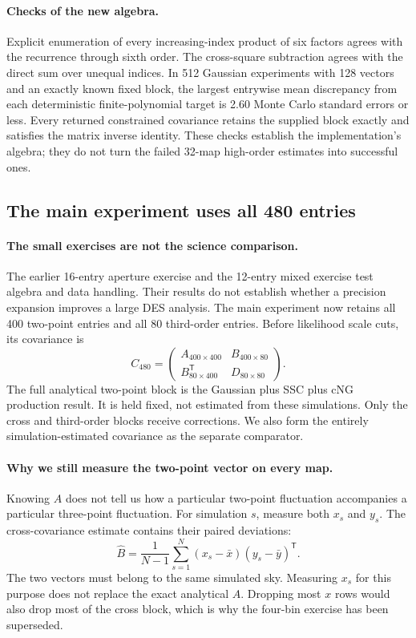 \paragraph{Checks of the new algebra.}
Explicit enumeration of every increasing-index product of six factors
agrees with the recurrence through sixth order. The cross-square subtraction
agrees with the direct sum over unequal indices. In 512 Gaussian experiments
with 128 vectors and an exactly known fixed block, the largest entrywise
mean discrepancy from each deterministic finite-polynomial target is 2.60
Monte Carlo standard errors or less. Every returned constrained covariance
retains the supplied block exactly and satisfies the matrix inverse identity.
These checks establish the implementation's algebra; they do not turn the
failed 32-map high-order estimates into successful ones.

\subsection{The main experiment uses all 480 entries}
\label{sec:full480}
\paragraph{The small exercises are not the science comparison.}
The earlier 16-entry aperture exercise and the 12-entry mixed exercise test
algebra and data handling. Their results do not establish whether a precision
expansion improves a large DES analysis. The main experiment now retains
all 400 two-point entries and all 80 third-order entries. Before likelihood
scale cuts, its covariance is
\begin{equation}
 C_{480}=\begin{pmatrix}A_{400\times400}&B_{400\times80}\\
 B^{\mathsf T}_{80\times400}&D_{80\times80}\end{pmatrix}.
\end{equation}
The full analytical two-point block is the Gaussian plus SSC plus cNG
production result. It is held fixed, not estimated from these simulations.
Only the cross and third-order blocks receive corrections. We also form the
entirely simulation-estimated covariance as the separate comparator.

\paragraph{Why we still measure the two-point vector on every map.}
Knowing $A$ does not tell us how a particular two-point fluctuation accompanies
a particular three-point fluctuation. For simulation $s$, measure both $x_s$
and $y_s$. The cross-covariance estimate contains their paired deviations:
\begin{equation}
 \widehat B=\frac{1}{N-1}\sum_{s=1}^{N}
 (x_s-\bar x)(y_s-\bar y)^{\mathsf T}.
\end{equation}
The two vectors must belong to the same simulated sky. Measuring $x_s$ for
this purpose does not replace the exact analytical $A$. Dropping most $x$
rows would also drop most of the cross block, which is why the four-bin
exercise has been superseded.

